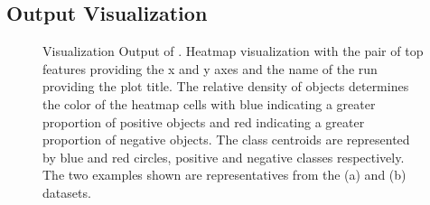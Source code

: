 
\subsection{Output Visualization}\label{ssec:viz}

\begin{figure}[h]
\centering %
\vspace{-3mm}
\vspace{-5mm}
\caption{Visualization Output of \genviz. Heatmap visualization with the pair of top features providing the x and y axes and the name of the run providing the plot title. The relative density of objects determines the color of the heatmap cells with blue indicating a greater proportion of positive objects and red indicating a greater proportion of negative objects. The class centroids are represented by blue and red circles, positive and negative classes respectively. The two examples shown are representatives from the (a) \msig and (b) \lincs datasets. }
\vspace{-5mm}
\label{fig:viz}
\end{figure}

